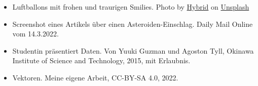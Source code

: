 \documentclass{beamer}
\begin{document}
\begin{frame}
\begin{tiny}
\begin{itemize}
\item
Luftballons mit frohen und traurigen Smilies. Photo by \href{https://unsplash.com/@artbyhybrid?utm_source=unsplash&utm_medium=referral&utm_content=creditCopyText}{Hybrid} on \href{https://unsplash.com/s/photos/feedback?utm_source=unsplash&utm_medium=referral&utm_content=creditCopyText}{Unsplash}


\item
Screenshot eines Artikels über einen Asteroiden-Einschlag. Daily Mail Online vom 14.3.2022.
\item
Studentin präsentiert Daten. Von Yuuki Guzman und Agoston Tyll, Okinawa Institute of Science and Technology, 2015, mit Erlaubnis. 
\item
Vektoren. Meine eigene Arbeit, CC-BY-SA 4.0, 2022.
\end{itemize}

\end{tiny}
\end{frame}
\end{document}
